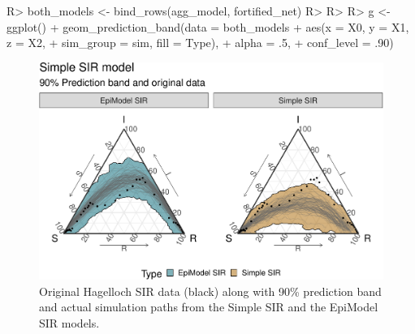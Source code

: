 \documentclass[
  shortnames]{jss}
\begin{document}
\begin{CodeChunk}
\begin{CodeInput}
R> both_models <- bind_rows(agg_model, fortified_net)
R> 
R> 
R> g <- ggplot() + geom_prediction_band(data = both_models %
+          aes(x = X0, y = X1, z = X2,
+               sim_group = sim, fill = Type),
+          alpha = .5,
+          conf_level = .90) 
\end{CodeInput}
\end{CodeChunk}

\begin{CodeChunk}
\begin{figure}[H]

{\centering \includegraphics{Figs/unnamed-chunk-16-1} 

}

\caption{\label{fig:hag-simple-sir}  Original Hagelloch SIR data (black) along with 90\% prediction band and actual simulation paths from the Simple SIR and the EpiModel SIR models.}\label{fig:unnamed-chunk-16}
\end{figure}
\end{CodeChunk}
\end{document}
